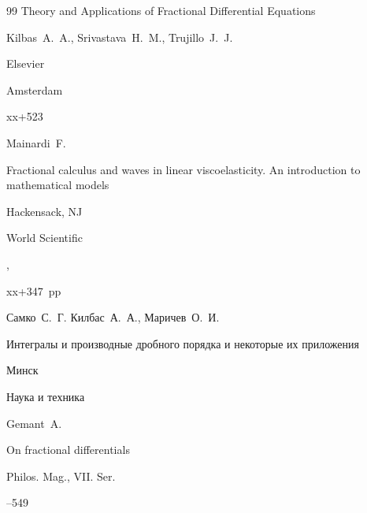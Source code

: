 \begin{thebibliography}{99}
\book Theory and Applications of Fractional Differential Equations

\by Kilbas~A.~A., Srivastava~H.~M., Trujillo~J.~J.

\publ Elsevier

\publaddr Amsterdam

\totalpages xx+523







\by Mainardi~F.

\book Fractional calculus and waves in linear viscoelasticity. An introduction to mathematical models

\publaddr Hackensack, NJ

\publ World Scientific

,


xx+347~pp






\by Самко~С.~Г. Килбас~А.~А., Маричев~О.~И.

\book Интегралы и производные дробного порядка и некоторые их приложения

\publaddr Минск

\publ Наука и техника









\by Gemant~A. 

\paper On fractional differentials

\jour Philos. Mag., VII. Ser.


--549 










\end{thebibliography}
